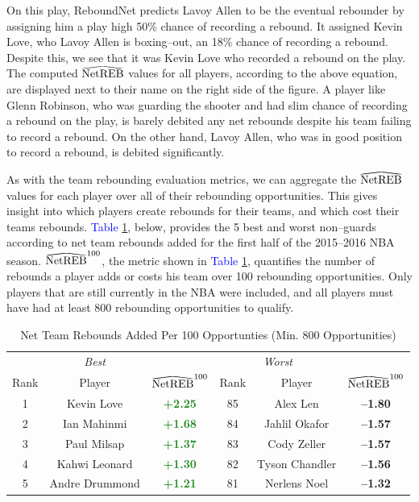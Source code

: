 \documentclass{article}
\newcommand\reallywidehat[1]{%
\savestack{\tmpbox}{\stretchto{%
  \scaleto{%
    \scalerel*[\widthof{\ensuremath{#1}}]{\kern-.6pt\bigwedge\kern-.6pt}%
    {\rule[-\textheight/2]{1ex}{\textheight}}%
  }{\textheight}%
}{0.5ex}}%
\stackon[1pt]{#1}{\tmpbox}%
}
\begin{document}
\noindent
On this play, ReboundNet predicts Lavoy Allen to be the eventual rebounder by assigning him a play high 50\% chance of recording a rebound. It assigned Kevin Love, who Lavoy Allen is boxing--out, an 18\% chance of recording a rebound. Despite this, we see that it was Kevin Love who recorded a rebound on the play. The computed $\reallywidehat{\text{NetREB}}$ values for all players, according to the above equation, are displayed next to their name on the right side of the figure. A player like Glenn Robinson, who was guarding the shooter and had slim chance of recording a rebound on the play, is barely debited any net rebounds despite his team failing to record a rebound. On the other hand, Lavoy Allen, who was in good position to record a rebound, is debited significantly.

\bigbreak
\noindent
As with the team rebounding evaluation metrics, we can aggregate the $\reallywidehat{\text{NetREB}}$ values for each player over all of their rebounding opportunities. This gives insight into which players create rebounds for their teams, and which cost their teams rebounds. \textcolor{blue}{Table} \ref{table:PlayerScores}, below, provides the 5 best and worst non--guards according to net team rebounds added for the first half of the 2015--2016 NBA season. $\reallywidehat{\text{NetREB}}^{100}$, the metric shown in \textcolor{blue}{Table} \ref{table:PlayerScores}, quantifies the number of rebounds a player adds or costs his team over 100 rebounding opportunities. Only players that are still currently in the NBA were included, and all players must have had at least 800 rebounding opportunities to qualify.

\renewcommand{\arraystretch}{1.0}
\begin{table}[htb]
  \centering
  \caption{Net Team Rebounds Added Per 100 Opportunties (Min. 800 Opportunities)}\label{table:PlayerScores}
  \begin{tabular}{cccccc}
  \toprule
 &\multicolumn{1}{c}{{\it Best}}
&
\multicolumn{4}{c}{{\it \quad \quad \quad Worst}} \\  \cmidrule(r){2-2}\cmidrule(l){5-5}
Rank & Player & $\reallywidehat{\text{NetREB}}^{100}$ & Rank & Player & $\reallywidehat{\text{NetREB}}^{100}$ \\
	\midrule
	1 & Kevin Love & {\bf \textcolor{ForestGreen}{+2.25}} & 85 & Alex Len & {\bf \textcolor{BrickRed}{--1.80}}  \\
	2 & Ian Mahinmi & {\bf \textcolor{ForestGreen}{+1.68}} &  84 & Jahlil Okafor & {\bf \textcolor{BrickRed}{--1.57}}  \\
	3 & Paul Milsap & {\bf \textcolor{ForestGreen}{+1.37}} &  83 & Cody Zeller & {\bf \textcolor{BrickRed}{--1.57}} \\
	4 & Kahwi Leonard  & {\bf \textcolor{ForestGreen}{+1.30}} & 82 & Tyson Chandler & {\bf \textcolor{BrickRed}{--1.56}} \\
	5 & Andre Drummond & {\bf \textcolor{ForestGreen}{+1.21}} & 81 & Nerlens Noel & {\bf \textcolor{BrickRed}{--1.32}} \\
\bottomrule
  \end{tabular}
\end{table}
\end{document}
